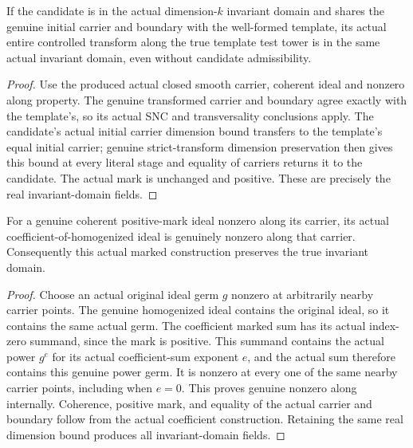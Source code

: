 \begin{lemma}
\label{hir:coherent-transform-entire-domain}
\leanok
If the candidate is in the actual dimension-$k$ invariant domain and shares
the genuine initial carrier and boundary with the well-formed template,
its actual entire controlled transform along the true template test tower
is in the same actual invariant domain, even without candidate admissibility.
\end{lemma}
\begin{proof}
Use the produced actual closed smooth carrier, coherent ideal and nonzero
along property. The genuine transformed carrier and boundary agree exactly
with the template's, so its actual SNC and transversality conclusions apply.
The candidate's actual initial carrier dimension bound transfers to the
template's equal initial carrier; genuine strict-transform dimension
preservation then gives this bound at every literal stage and equality of
carriers returns it to the candidate. The actual mark is unchanged and
positive. These are precisely the real invariant-domain fields.
\end{proof}

\begin{lemma}
\label{hir:coherent-transform-coefficient-nonzero}
\leanok
For a genuine coherent positive-mark ideal nonzero along its carrier, its
actual coefficient-of-homogenized ideal is genuinely nonzero along that
carrier. Consequently this actual marked construction preserves the true
invariant domain.
\end{lemma}
\begin{proof}
Choose an actual original ideal germ $g$ nonzero at arbitrarily nearby
carrier points. The genuine homogenized ideal contains the original ideal,
so it contains the same actual germ. The coefficient marked sum has its
actual index-zero summand, since the mark is positive. This summand contains
the actual power $g^e$ for its actual coefficient-sum exponent $e$, and the
actual sum therefore contains this genuine power germ. It is nonzero at
every one of the same nearby carrier points, including when $e=0$.
This proves genuine nonzero along internally. Coherence, positive mark,
and equality of the actual carrier and boundary follow from the actual
coefficient construction. Retaining the same real dimension bound produces
all invariant-domain fields.
\end{proof}

